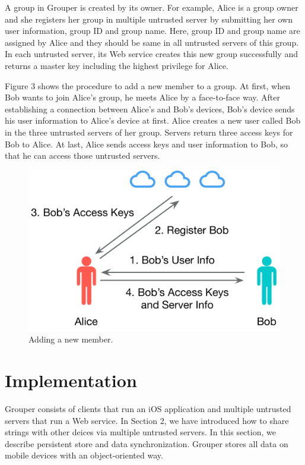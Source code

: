 \documentclass[twocolumn,10pt]{article}
\begin{document}
A group in Grouper is created by its owner. For example, Alice is a group owner and she registers her group in multiple untrusted server by submitting her own user information, group ID and group name. Here, group ID and group name are assigned by Alice and they should be same in all untrusted servers of this group. In each untrusted server, its Web service creates this new group successfully and returns a master key including the highest privilege for Alice.

Figure 3 shows the procedure to add a new member to a group. At first, when Bob wants to join Alice's group, he meets Alice by a face-to-face way. After establishing a connection between Alice's and Bob's devices, Bob's device sends his user information to Alice's device at first. Alice creates a new user called Bob in the three untrusted servers of her group. Servers return three access keys for Bob to Alice. At last, Alice sends access keys and user information to Bob, so that he can access those untrusted servers.

\begin{figure}[t]
	\centering
	\includegraphics[scale=0.38]{add_member}
	\caption{Adding a new member.}
\end{figure}

\section{Implementation}
Grouper consists of clients that run an iOS application and multiple untrusted servers that run a Web service. In Section 2, we have introduced how to share strings with other deices via multiple untrusted servers. In this section, we describe persistent store and data synchronization. Grouper stores all data on mobile devices with an object-oriented way.
\end{document}
